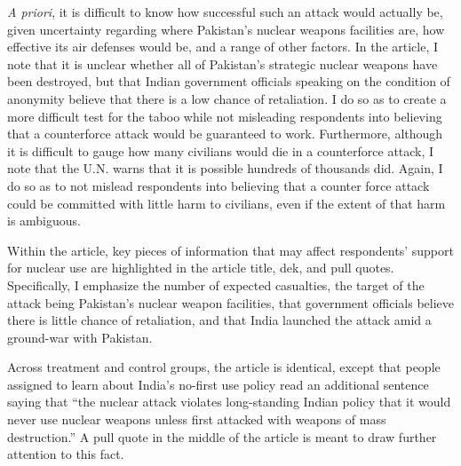 \documentclass[12pt]{article}
\begin{document}
\textit{A priori}, it is difficult to know how successful such an attack would actually be, given uncertainty regarding where Pakistan's nuclear weapons facilities are, how effective its air defenses would be, and a range of other factors. In the article, I note that it is unclear whether all of Pakistan's strategic nuclear weapons have been destroyed, but that Indian government officials speaking on the condition of anonymity believe that there is a low chance of retaliation. I do so as to create a more difficult test for the taboo while not misleading respondents into believing that a counterforce attack would be guaranteed to work. Furthermore, although it is difficult to gauge how many civilians would die in a counterforce attack, I note that the U.N. warns that it is possible hundreds of thousands did. Again, I do so as to not mislead respondents into believing that a counter force attack could be committed with little harm to civilians, even if the extent of that harm is ambiguous.

Within the article, key pieces of information that may affect respondents' support for nuclear use are highlighted in the article title, dek, and pull quotes. Specifically, I emphasize the number of expected casualties, the target of the attack being Pakistan's nuclear weapon facilities, that government officials believe there is little chance of retaliation, and that India launched the attack amid a ground-war with Pakistan.

Across treatment and control groups, the article is identical, except that people assigned to learn about India's no-first use policy read an additional sentence saying that ``the nuclear attack violates long-standing Indian policy that it would never use nuclear weapons unless first attacked with weapons of mass destruction.'' A pull quote in the middle of the article is meant to draw further attention to this fact.
\end{document}
